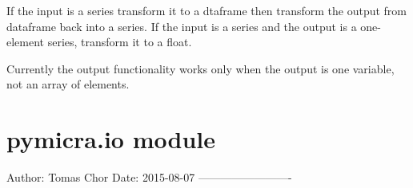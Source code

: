 \documentclass[a4paper,10pt,oneside]{sphinxmanual}
\begin{document}

\begin{fulllineitems}
\label{pymicra:pymicra.decorators.pdgeneral}
\end{fulllineitems}


\begin{fulllineitems}
\label{pymicra:pymicra.decorators.pdgeneral_in}
\end{fulllineitems}


\begin{fulllineitems}
\label{pymicra:pymicra.decorators.pdgeneral_io}
If the input is a series transform it to a dtaframe then transform the output from dataframe
back into a series. If the input is a series and the output is a one-element series, transform it to a float.

Currently the output functionality works only when the output is one variable, not an array
of elements.

\end{fulllineitems}



\section{pymicra.io module}
\label{pymicra:module-pymicra.io}\label{pymicra:pymicra-io-module}
Author: Tomas Chor
Date: 2015-08-07
-------------------------

\begin{fulllineitems}
\label{pymicra:pymicra.io.dataset}
\end{fulllineitems}

\end{document}
